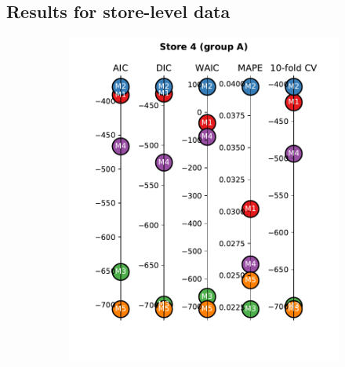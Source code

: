 \documentclass[english, 12pt, a4paper, sci, utf8, a-1b, online]{aaltothesis}
\begin{document}
\begin{abstractpage}[english]
 





\clearpage




\clearpage
\thesisappendix

\section{Results for store-level data\label{app:single_store_results}}

\begin{figure}[hbt]
	\begin{subfigure}[htb]{0.3\textwidth}
		\centering
		\includegraphics[width=\textwidth]{../plots/metrics/metrics_plot_single_store_4_of_A.pdf}
	\end{subfigure}
	\hfill
	\begin{subfigure}[htb]{0.3\textwidth}
		\centering

\end{subfigure}
\end{figure}
\end{abstractpage}
\end{document}
